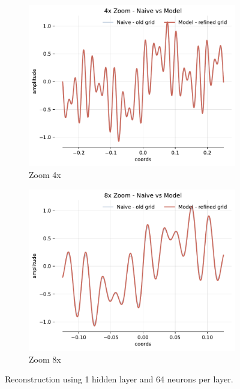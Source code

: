 \begin{figure}[h]
    \begin{subfigure}[b]{0.4\textwidth}
        \centering
        \includegraphics[width=\textwidth]{img/ch3/4x_zoom_1hl_64hf_w10.pdf}
        \caption{Zoom 4x}
        \label{fig:4x-freqs-1hl-64hf}
    \end{subfigure}
    \begin{subfigure}[b]{0.4\textwidth}
        \centering
        \includegraphics[width=\textwidth]{img/ch3/8x_zoom_1hl_64hf_w10.pdf}
        \caption{Zoom 8x}
        \label{fig:8x-freqs-1hl-64hf}
    \end{subfigure}
    \caption{Reconstruction using 1 hidden layer and 64 neurons per layer.}
    \label{f:w10-1hl-64hf}
\end{figure}


